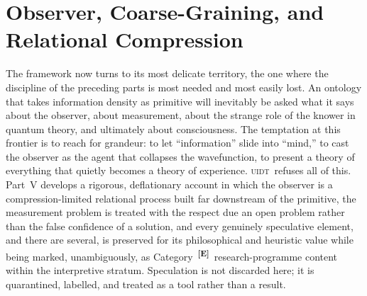 \documentclass[12pt,a4paper,twoside]{article}
\theoremstyle{plain}
\theoremstyle{definition}
\theoremstyle{remark}
\newcommand{\UIDT}{\textsc{uidt}}
\newcommand{\catmark}[1]{\textsuperscript{\textsf{\textbf{[#1]}}}}
\begin{document}

\part{Observer, Coarse-Graining, and Relational Compression}
\label{part:observer}

\noindent The framework now turns to its most delicate territory, the one where the discipline of the preceding parts is most needed and most easily lost. An ontology that takes information density as primitive will inevitably be asked what it says about the observer, about measurement, about the strange role of the knower in quantum theory, and ultimately about consciousness. The temptation at this frontier is to reach for grandeur: to let ``information'' slide into ``mind,'' to cast the observer as the agent that collapses the wavefunction, to present a theory of everything that quietly becomes a theory of experience. \UIDT\ refuses all of this. Part~V develops a rigorous, deflationary account in which the observer is a compression-limited relational process built far downstream of the primitive, the measurement problem is treated with the respect due an open problem rather than the false confidence of a solution, and every genuinely speculative element, and there are several, is preserved for its philosophical and heuristic value while being marked, unambiguously, as Category~\catmark{E}\ research-programme content within the interpretive stratum. Speculation is not discarded here; it is quarantined, labelled, and treated as a tool rather than a result.
\end{document}
